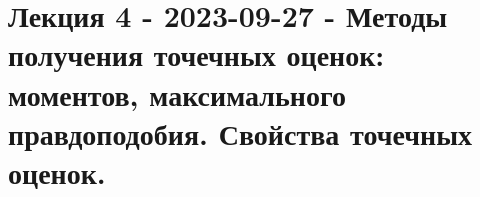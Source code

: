 \chapter{Лекция 4 - 2023-09-27 - Методы получения точечных оценок: моментов, максимального
правдоподобия. Свойства точечных оценок.}






